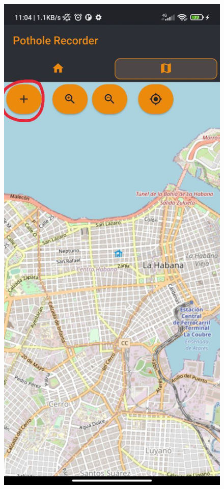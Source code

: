 	\begin{figure}[htb]
		\centering
		\includegraphics[scale = 0.175]{Graphics/load_marks_to_map_1.jpg}

\end{figure}
